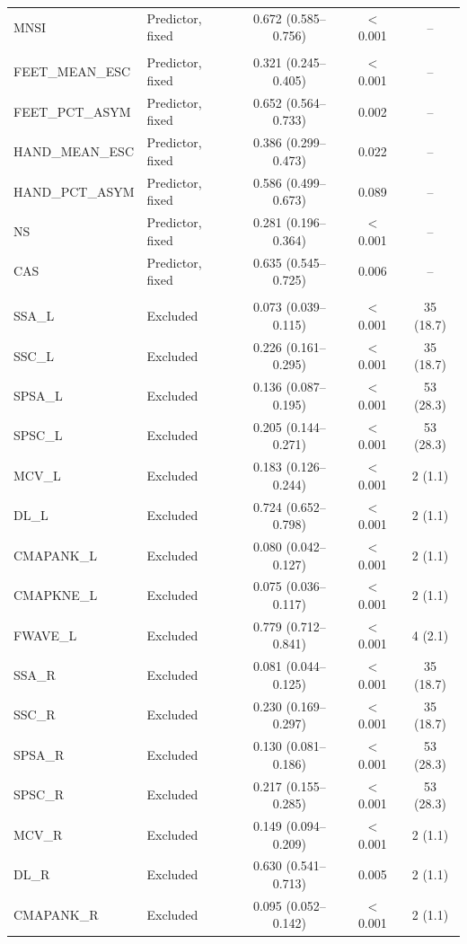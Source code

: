 \begin{table}[!ht]
\begin{tabular}{llccc}
MNSI & Predictor, fixed & 0.672 (0.585--0.756) & $<$0.001 & -- \\
\addlinespace
\multicolumn{5}{l}{\textit{Sudoscan}} \\
FEET\_MEAN\_ESC & Predictor, fixed & 0.321 (0.245--0.405) & $<$0.001 & -- \\
FEET\_PCT\_ASYM & Predictor, fixed & 0.652 (0.564--0.733) & 0.002 & -- \\
HAND\_MEAN\_ESC & Predictor, fixed & 0.386 (0.299--0.473) & 0.022 & -- \\
HAND\_PCT\_ASYM & Predictor, fixed & 0.586 (0.499--0.673) & 0.089 & -- \\
NS & Predictor, fixed & 0.281 (0.196--0.364) & $<$0.001 & -- \\
CAS & Predictor, fixed & 0.635 (0.545--0.725) & 0.006 & -- \\
\addlinespace
\multicolumn{5}{l}{\textit{Nerve conduction study}} \\
SSA\_L & Excluded & 0.073 (0.039--0.115) & $<$0.001 & 35 (18.7) \\
SSC\_L & Excluded & 0.226 (0.161--0.295) & $<$0.001 & 35 (18.7) \\
SPSA\_L & Excluded & 0.136 (0.087--0.195) & $<$0.001 & 53 (28.3) \\
SPSC\_L & Excluded & 0.205 (0.144--0.271) & $<$0.001 & 53 (28.3) \\
MCV\_L & Excluded & 0.183 (0.126--0.244) & $<$0.001 & 2 (1.1) \\
DL\_L & Excluded & 0.724 (0.652--0.798) & $<$0.001 & 2 (1.1) \\
CMAPANK\_L & Excluded & 0.080 (0.042--0.127) & $<$0.001 & 2 (1.1) \\
CMAPKNE\_L & Excluded & 0.075 (0.036--0.117) & $<$0.001 & 2 (1.1) \\
FWAVE\_L & Excluded & 0.779 (0.712--0.841) & $<$0.001 & 4 (2.1) \\
SSA\_R & Excluded & 0.081 (0.044--0.125) & $<$0.001 & 35 (18.7) \\
SSC\_R & Excluded & 0.230 (0.169--0.297) & $<$0.001 & 35 (18.7) \\
SPSA\_R & Excluded & 0.130 (0.081--0.186) & $<$0.001 & 53 (28.3) \\
SPSC\_R & Excluded & 0.217 (0.155--0.285) & $<$0.001 & 53 (28.3) \\
MCV\_R & Excluded & 0.149 (0.094--0.209) & $<$0.001 & 2 (1.1) \\
DL\_R & Excluded & 0.630 (0.541--0.713) & 0.005 & 2 (1.1) \\
CMAPANK\_R & Excluded & 0.095 (0.052--0.142) & $<$0.001 & 2 (1.1) \\

\end{tabular}
\end{table}
